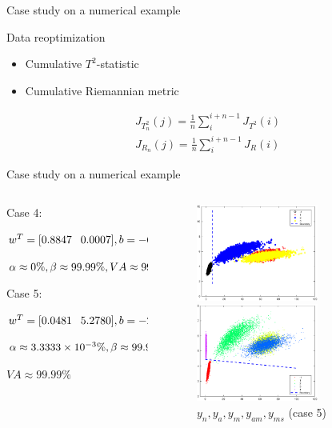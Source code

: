 \documentclass[10pt]{beamer}
\begin{document}
\begin{frame}{Case study on a numerical example}
      \begin{exampleblock}{Data reoptimization}
	\begin{itemize}
    \item Cumulative  $T^2$-statistic
    \item Cumulative  Riemannian metric
    \end{itemize}
    \end{exampleblock}
    \begin{small}
    \begin{equation}\nonumber
       \begin{aligned}
       J_{T_n^2}(j) = \frac{1}{n}\sum_{i}^{i+n-1}J_{T^2}(i) \\
       J_{R_n}(j) = \frac{1}{n}\sum_{i}^{i+n-1}J_R(i)
       \end{aligned}
    \end{equation}
    \end{small}
\end{frame}
\begin{frame}{Case study on a numerical example}
     \begin{columns}
             \begin{column}{0.5\textwidth}
       Case 4: \par
     $\scriptsize{w^T = [ 0.8847 \quad 0.0007]
 , b =-6.3180 } $\par $\scriptsize{\alpha  \approx 0\%,\beta  \approx 99.99 \% ,VA \approx 99.99} \% $ \par 
Case 5: \par 
   $\scriptsize{w^T = [0.0481 \quad 5.2780]
 , b = -23.5837} $\par $\scriptsize{\alpha  \approx 3.3333\times 10^{-3} \%,\beta  \approx 99.97\% }$ \par 
$VA \approx 99.99 \% $
           \end{column}
        \begin{column}{0.5\textwidth}  %
    \begin{figure}
        \centering
        \includegraphics[width=4cm]{fig/Cu3.eps}
        \caption{$y_n,y_a,y_m,y_{am}$ (case 4)}
        \includegraphics[width=4cm]{fig/miniVarP.eps}
        \caption{ $y_n,y_a,y_{m},y_{am},y_{ms}$ (case 5)}
        \end{figure}
  
        \end{column}
    \end{columns}
\end{frame}
\end{document}
